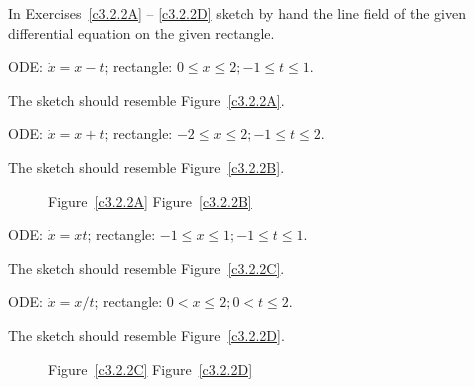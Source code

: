 \documentclass{ximera}
\begin{document}
\noindent In Exercises~\ref{c3.2.2A} -- \ref{c3.2.2D} sketch by hand the line 
field of the given differential equation on the given rectangle.
\begin{exercise} \label{c3.2.2A}
ODE: $\dot{x}=x-t$; rectangle: $0\leq x\leq 2; -1\leq t\leq 1$.

\begin{solution}
The sketch should resemble Figure~\ref{c3.2.2A}.

\end{solution}
\end{exercise}
\begin{exercise} \label{c3.2.2B}
ODE: $\dot{x}=x+t$; rectangle: $-2\leq x\leq 2; -1\leq t\leq 2$.

\begin{solution}
The sketch should resemble Figure~\ref{c3.2.2B}.
\begin{figure}[th]
     \centerline{%
     }
	\centerline{Figure~\ref{c3.2.2A}\hspace{2.1in} Figure~\ref{c3.2.2B}}
\end{figure} 

\end{solution}
\end{exercise}
\begin{exercise} \label{c3.2.2C}
ODE: $\dot{x}=xt$; rectangle: $-1\leq x\leq 1; -1\leq t\leq 1$.

\begin{solution}
The sketch should resemble Figure~\ref{c3.2.2C}.

\end{solution}
\end{exercise}
\begin{exercise} \label{c3.2.2D}
ODE: $\dot{x}=x/t$; rectangle: $0< x\leq 2; 0< t\leq 2$.

\begin{solution}
The sketch should resemble Figure~\ref{c3.2.2D}.
\begin{figure}[th]
     \centerline{%
     }
	\centerline{Figure~\ref{c3.2.2C}\hspace{2.1in} Figure~\ref{c3.2.2D}}
\end{figure} 

\end{solution}
\end{exercise}
\end{document}
